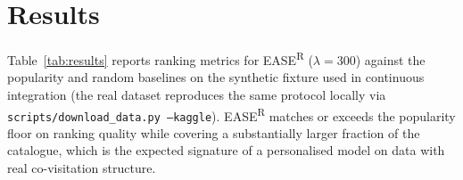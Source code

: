 \section{Results}

Table~\ref{tab:results} reports ranking metrics for
EASE\textsuperscript{R} ($\lambda=300$) against the popularity and random
baselines on the synthetic fixture used in continuous integration (the real
dataset reproduces the same protocol locally via
\texttt{scripts/download\_data.py --kaggle}). EASE\textsuperscript{R}
matches or exceeds the popularity floor on ranking quality while covering a
substantially larger fraction of the catalogue, which is the expected
signature of a personalised model on data with real co-visitation
structure.
